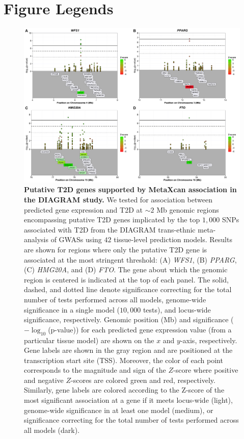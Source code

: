 \documentclass[10pt]{article}
\begin{document}






\section*{Figure Legends}

\begin{figure}
\includegraphics[width=\textwidth]{fig1_locusArray.png}
\caption{\textbf{Putative T2D genes supported by MetaXcan association in the DIAGRAM study.} We tested for association between predicted gene expression and T2D at $\sim2$ Mb genomic regions encompassing putative T2D genes implicated by the top $1,000$ SNPs associated with T2D from the DIAGRAM trans-ethnic meta-analysis of GWASs using $42$ tissue-level prediction models. Results are shown for regions where only the putative T2D gene is associated at the most stringent threshold: (A) \textit{WFS1}, (B) \textit{PPARG}, (C) \textit{HMG20A}, and (D) \textit{FTO}. The gene about which the genomic region is centered is indicated at the top of each panel. The solid, dashed, and dotted line denote significance correcting for the total number of tests performed across all models, genome-wide significance in a single model ($10,000$ tests), and locus-wide significance, respectively. Genomic position (Mb) and significance ($-\log_{10}$(p-value)) for each predicted gene expression value (from a particular tissue model) are shown on the $x$ and $y$-axis, respectively. Gene labels are shown in the gray region and are positioned at the transcription start site (TSS). Moreover, the color of each point corresponds to the magnitude and sign of the $Z$-score where positive and negative $Z$-scores are colored green and red, respectively. Similarly, gene labels are colored according to the Z-score of the most significant association at a gene if it meets locus-wide (light), genome-wide significance in at least one model (medium), or significance correcting for the total number of tests performed across all models (dark). } 
\label{fig:locus_array_1}
\end{figure}
\end{document}
